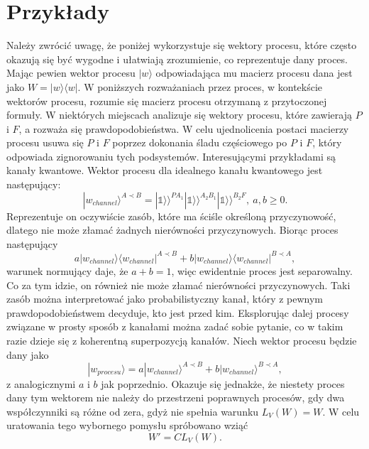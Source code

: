 \documentclass[10pt]{article} %
\newcommand{\Ket}[1]{|#1\rangle}
\newcommand{\Bra}[1]{\langle#1|}
\newcommand{\KKet}[1]{|#1\rangle\rangle}
\newcommand{\I}{\mathbb{1}}
\begin{document}
\section{Przykłady}
Należy zwrócić uwagę, że poniżej wykorzystuje się wektory procesu, które często okazują się być wygodne i ułatwiają zrozumienie, co reprezentuje dany proces.
Mając pewien wektor procesu $\Ket{w}$ odpowiadająca mu macierz procesu dana jest jako $W = \Ket{w}\Bra{w}$. W poniższych rozważaniach przez proces, w kontekście wektorów procesu, rozumie się macierz procesu otrzymaną z przytoczonej formuły. W niektórych miejscach analizuje się wektory procesu, które zawierają $P$ i $F$, a rozważa się prawdopodobieństwa. W celu ujednolicenia postaci macierzy procesu usuwa się $P$ i $F$ poprzez dokonania śladu częściowego po $P$ i $F$, który odpowiada zignorowaniu tych podsystemów.
Interesującymi przykładami są kanały kwantowe. Wektor procesu dla idealnego kanału kwantowego jest następujący:
\begin{equation}
\Ket{w_{channel}}^{A \prec B} = \KKet{\I}^{PA_1}\KKet{\I}^{A_2B_1}\KKet{\I}^{B_2F},~ a,b\geq0.
\end{equation}
Reprezentuje on oczywiście zasób, które ma ściśle określoną przyczynowość, dlatego nie może złamać żadnych nierówności przyczynowych.
Biorąc proces następujący
\begin{equation}
a\Ket{w_{channel}}\Bra{w_{channel}}^{A \prec B} + b\Ket{w_{channel}}\Bra{w_{channel}}^{B \prec A},
\end{equation} warunek normujący daje, że $a+b=1$, więc ewidentnie proces jest separowalny. Co za tym idzie, on również nie może złamać nierówności przyczynowych. Taki zasób można interpretować jako probabilistyczny kanał, który z pewnym prawdopodobieństwem decyduje, kto jest przed kim.
Eksplorując dalej procesy związane w prosty sposób z kanałami można zadać sobie pytanie, co w takim razie dzieje się z koherentną superpozycją kanałów. Niech wektor procesu będzie dany jako
\begin{equation}
\Ket{w_{procesu}} = a\Ket{w_{channel}}^{A \prec B} + b\Ket{w_{channel}}^{B \prec A},
\end{equation} z analogicznymi $a$ i $b$ jak poprzednio.
Okazuje się jednakże, że niestety proces dany tym wektorem nie należy do przestrzeni poprawnych procesów, gdy dwa współczynniki są różne od zera, gdyż nie spełnia warunku $L_V(W) = W$. W celu uratowania tego wybornego pomysłu spróbowano wziąć 
\begin{equation}
\label{cut}
W' = CL_V(W).
\end{equation}
\end{document}

